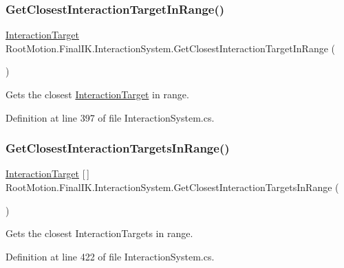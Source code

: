 \subsubsection{\texorpdfstring{Get\+Closest\+Interaction\+Target\+In\+Range()}{GetClosestInteractionTargetInRange()}}
{\footnotesize\ttfamily \mbox{\hyperlink{class_root_motion_1_1_final_i_k_1_1_interaction_target}{Interaction\+Target}} Root\+Motion.\+Final\+I\+K.\+Interaction\+System.\+Get\+Closest\+Interaction\+Target\+In\+Range (\begin{DoxyParamCaption}{ }\end{DoxyParamCaption})}



Gets the closest \mbox{\hyperlink{class_root_motion_1_1_final_i_k_1_1_interaction_target}{Interaction\+Target}} in range. 



Definition at line 397 of file Interaction\+System.\+cs.

\mbox{\label{class_root_motion_1_1_final_i_k_1_1_interaction_system_a43ffee1b7612900f277f9ceed7e4fbc1}} 
\subsubsection{\texorpdfstring{Get\+Closest\+Interaction\+Targets\+In\+Range()}{GetClosestInteractionTargetsInRange()}}
{\footnotesize\ttfamily \mbox{\hyperlink{class_root_motion_1_1_final_i_k_1_1_interaction_target}{Interaction\+Target}} \mbox{[}$\,$\mbox{]} Root\+Motion.\+Final\+I\+K.\+Interaction\+System.\+Get\+Closest\+Interaction\+Targets\+In\+Range (\begin{DoxyParamCaption}{ }\end{DoxyParamCaption})}



Gets the closest Interaction\+Targets in range. 



Definition at line 422 of file Interaction\+System.\+cs.


